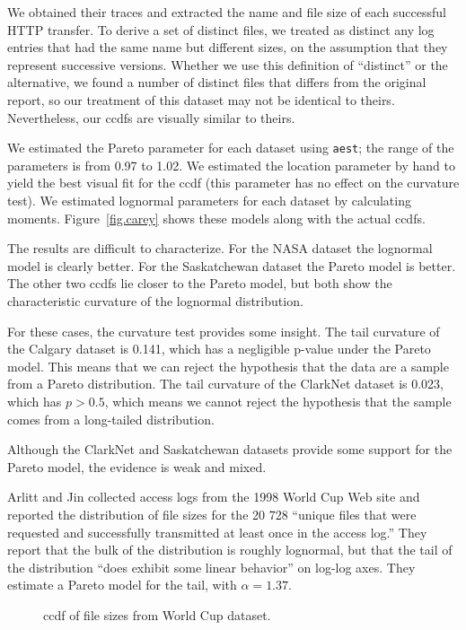 \documentclass{elsart}
\begin{document}
We obtained their traces and extracted the name and file size of each
successful HTTP transfer.  To derive a set of distinct files, we
treated as distinct any log entries that had the same name but
different sizes, on the assumption that they represent successive
versions.  Whether we use this definition of ``distinct'' or the
alternative, we found a number of distinct files that differs from the
original report, so our treatment of this dataset may not be identical
to theirs.  Nevertheless, our ccdfs are visually similar to theirs.

We estimated the Pareto parameter for each dataset using {\tt aest};
the range of the parameters is from 0.97 to 1.02.  We estimated the
location parameter by hand to yield the best visual fit for the ccdf
(this parameter has no effect on the curvature test).  We
estimated lognormal parameters for each dataset by calculating
moments.  Figure~\ref{fig.carey} shows these models along with the
actual ccdfs.

The results are difficult to characterize.  For the NASA dataset the
lognormal model is clearly better.  For the Saskatchewan dataset the
Pareto model is better.  The other two ccdfs lie
closer to the Pareto model, but both show the characteristic
curvature of the lognormal distribution.

For these cases, the curvature test provides some insight.  The tail
curvature of the Calgary dataset is 0.141, which has a negligible
p-value under the Pareto model.  This means that we can reject the
hypothesis that the data are a sample from a Pareto distribution.
The tail curvature of the ClarkNet
dataset is 0.023, which has
$p > 0.5$, which means we cannot reject the hypothesis that the
sample comes from a long-tailed distribution.

Although the ClarkNet and Saskatchewan datasets provide some support for
the Pareto model, the evidence is weak and mixed.

Arlitt and Jin collected access logs from the 1998 World Cup Web site
\cite{ArlittJin99} and reported the distribution of file sizes for the
20 728 ``unique files that were requested and successfully transmitted
at least once in the access log.''
They report that the bulk of the distribution is roughly
lognormal, but that the tail of the distribution ``does
exhibit some linear behavior'' on log-log axes.  They estimate
a Pareto model for the tail, with $\alpha = 1.37$.

\begin{figure}[tb]
\centerline{}
\caption{
ccdf of file sizes from World Cup dataset. }
\label{fig.arlitt}
\end{figure}
\end{document}

